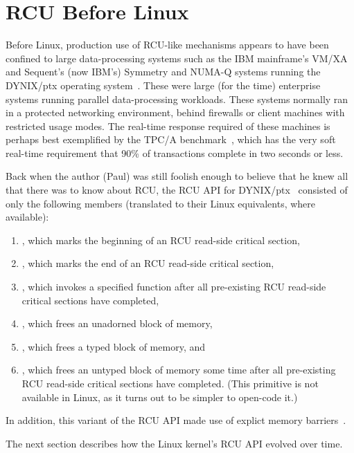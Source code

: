 \section{RCU Before Linux}
\label{sec:app:rcuhist:RCU Before Linux}

Before Linux, production use of RCU-like mechanisms appears to have been
confined to large data-processing systems such as the
IBM mainframe's VM/XA~\cite{Hennessy89} and Sequent's (now IBM's)
Symmetry and NUMA-Q systems running the DYNIX/ptx operating
system~\cite{McKenney98}.
These were large (for the time) enterprise systems running parallel
data-processing workloads.
These systems normally ran in a protected networking environment,
behind firewalls or client machines with restricted usage modes.
The real-time response required of these machines is perhaps best
exemplified by the TPC/A benchmark~\cite{TPCA1989}, which has the
very soft real-time requirement
that 90\% of transactions complete in two seconds or less.

Back when the author (Paul) was still foolish enough to believe that
he knew all
that there was to know about RCU,
the RCU API for DYNIX/ptx~\cite{McKenney01b} consisted of only
the following members (translated to their Linux equivalents,
where available):
\begin{enumerate}
\item	{}, which marks the beginning of an
	RCU read-side critical section,
\item	{}, which marks the end of an RCU
	read-side critical section,
\item	{}, which invokes a specified function after
	all pre-existing RCU read-side critical sections
	have completed,
\item	{}, which frees an unadorned block of memory,
\item	{}, which frees a typed block of memory, and
\item	{}, which frees an untyped block of
	memory some time after all pre-existing RCU read-side
	critical sections have completed.
	(This primitive is not available in Linux, as it turns out
	to be simpler to open-code it.)
\end{enumerate}
In addition, this variant of the RCU API made use of explict
memory barriers~\cite{PaulMcKenney2005i}.

The next section describes how the Linux kernel's RCU API evolved over time.


